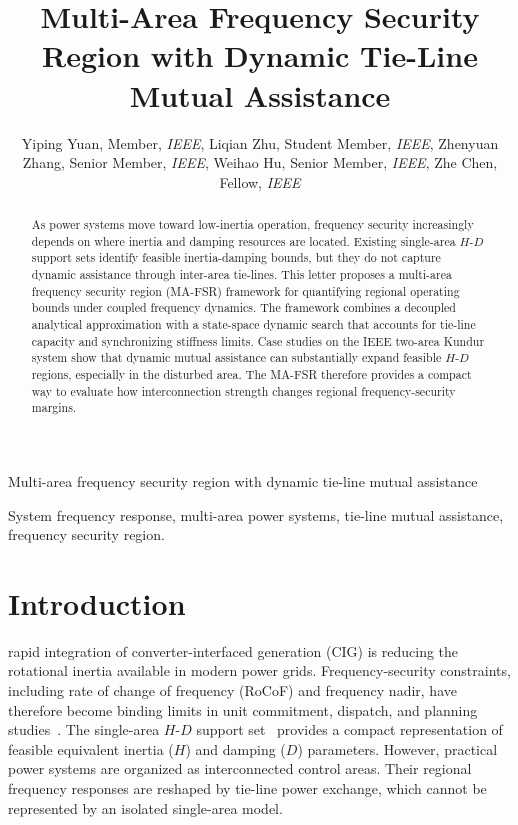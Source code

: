 \documentclass[lettersize,journal]{IEEEtran}
\begin{document}
\title{\vspace{-0.5cm}
Multi-Area Frequency Security Region with Dynamic Tie-Line Mutual Assistance
}
\author{Yiping Yuan, Member, \textit{IEEE}, Liqian Zhu, Student Member, \textit{IEEE}, Zhenyuan Zhang, Senior Member, \textit{IEEE}, Weihao Hu, Senior Member, \textit{IEEE}, Zhe Chen, Fellow, \textit{IEEE}
}
\IEEEaftertitletext{\vspace{-2.5\baselineskip}}

%
{Multi-area frequency security region with dynamic tie-line mutual assistance}

\maketitle

\begin{abstract}
As power systems move toward low-inertia operation, frequency security increasingly depends on where inertia and damping resources are located. Existing single-area $H$-$D$ support sets identify feasible inertia-damping bounds, but they do not capture dynamic assistance through inter-area tie-lines. This letter proposes a multi-area frequency security region (MA-FSR) framework for quantifying regional operating bounds under coupled frequency dynamics. The framework combines a decoupled analytical approximation with a state-space dynamic search that accounts for tie-line capacity and synchronizing stiffness limits. Case studies on the IEEE two-area Kundur system show that dynamic mutual assistance can substantially expand feasible $H$-$D$ regions, especially in the disturbed area. The MA-FSR therefore provides a compact way to evaluate how interconnection strength changes regional frequency-security margins.
\end{abstract}

\begin{IEEEkeywords}
System frequency response, multi-area power systems, tie-line mutual assistance, frequency security region.
\end{IEEEkeywords}

\vspace{-0.25cm}

\section{Introduction}
 rapid integration of converter-interfaced generation (CIG) is reducing the rotational inertia available in modern power grids. Frequency-security constraints, including rate of change of frequency (RoCoF) and frequency nadir, have therefore become binding limits in unit commitment, dispatch, and planning studies~\cite{8918440,10168982,markovic2019optimal,9765359}. The single-area $H$-$D$ support set~\cite{manuscript} provides a compact representation of feasible equivalent inertia ($H$) and damping ($D$) parameters. However, practical power systems are organized as interconnected control areas. Their regional frequency responses are reshaped by tie-line power exchange, which cannot be represented by an isolated single-area model.
\end{document}
